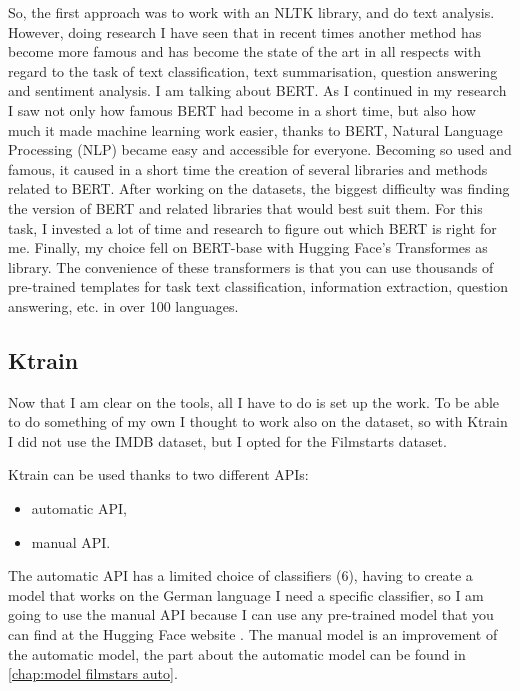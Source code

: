 So, the first approach was to work with an NLTK library, and do text analysis.
However, doing research I have seen that in recent times another method has become more famous and has become the state of the art in all respects with regard to the task of text classification, text summarisation, question answering and sentiment analysis.
I am talking about \gls{BERT}.
As I continued in my research I saw not only how famous \gls{BERT} had become in a short time, but also how much it made machine learning work easier, thanks to \gls{BERT}, Natural Language Processing (NLP) became easy and accessible for everyone.
Becoming so used and famous, it caused in a short time the creation of several libraries and methods related to \gls{BERT}.
After working on the datasets, the biggest difficulty was finding the version of \gls{BERT} and related libraries that would best suit them.
For this task, I invested a lot of time and research to figure out which \gls{BERT} is right for me.
Finally, my choice fell on \gls{BERT}-base with \gls{Hugging Face}'s Transformes as library.
The convenience of these transformers is that you can use thousands of pre-trained templates for task text classification, information extraction, question answering, etc. in over 100 languages.

\subsection{Ktrain}
\label{chap:Ktrain model}
Now that I am clear on the tools, all I have to do is set up the work.
To be able to do something of my own I thought to work also on the dataset, so with \gls{Ktrain} I did not use the IMDB dataset, but I opted for the Filmstarts dataset.

\gls{Ktrain} can be used thanks to two different APIs:
\begin{itemize}
    \item automatic API,
    \item manual API.
\end{itemize}

The automatic API has a limited choice of classifiers (6), having to create a model that works on the German language I need a specific classifier, so I am going to use the manual API because I can use any pre-trained model that you can find at the \gls{Hugging Face} website \cite{noauthor_hugging_nodate}.
The manual model is an improvement of the automatic model, the part about the automatic model can be found in \autoref{chap:model filmstars auto}.


